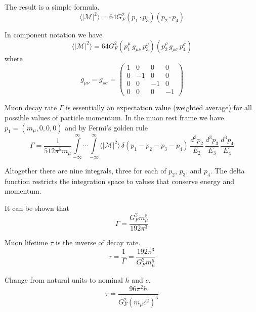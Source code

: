 \documentclass[12pt]{article}
\begin{document}
\noindent
The result is a simple formula.
\begin{equation*}
\langle|\mathcal{M}|^2\rangle=64G_F^2(p_1\cdot p_3)(p_2\cdot p_4)
\tag{1}
\end{equation*}

\noindent
In component notation we have
\begin{equation*}
\langle|\mathcal{M}|^2\rangle=64G_F^2
(p_1^\mu \, g_{\mu\nu} \, p_3^\nu)
(p_2^\rho \, g_{\rho\sigma} \, p_4^\sigma)
\end{equation*}
where
\begin{equation*}
g_{\mu\nu}=g_{\rho\sigma}=\begin{pmatrix}
1 & 0 & 0 & 0\\
0 & -1 & 0 & 0\\
0 & 0 & -1 & 0\\
0 & 0 & 0 & -1
\end{pmatrix}
\end{equation*}

\noindent
Muon decay rate $\Gamma$ is essentially an expectation value (weighted average)
for all possible values of particle momentum.
In the muon rest frame we have $p_1=(m_\mu,0,0,0)$ and by Fermi's golden rule
\begin{equation*}
\Gamma=\frac{1}{512\pi^5m_\mu}
\int\limits_{-\infty}^\infty \cdots \int\limits_{-\infty}^\infty
\langle|\mathcal{M}|^2\rangle
\,\delta(p_1-p_2-p_3-p_4)
\,\frac{d^3p_2}{E_2}\,\frac{d^3p_3}{E_3}\,\frac{d^3p_4}{E_4}
\end{equation*}

\noindent
Altogether there are nine integrals, three for each of $p_2$, $p_3$, and $p_4$.
The delta function restricts the integration space to values that conserve energy and momentum.

\bigskip
\noindent
It can be shown that
\begin{equation*}
\Gamma=\frac{G_F^2 m_\mu^5}{192\pi^3}
\end{equation*}

\noindent
Muon lifetime $\tau$ is the inverse of decay rate.
\begin{equation*}
\tau=\frac{1}{\Gamma}=\frac{192\pi^3}{G_F^2 m_\mu^5}
\end{equation*}

\noindent
Change from natural units to nominal $h$ and $c$.
\begin{equation*}
\tau
=\frac{96\pi^2h}{G_F^2\left(m_\mu c^2\right)^5}
\end{equation*}
\end{document}
